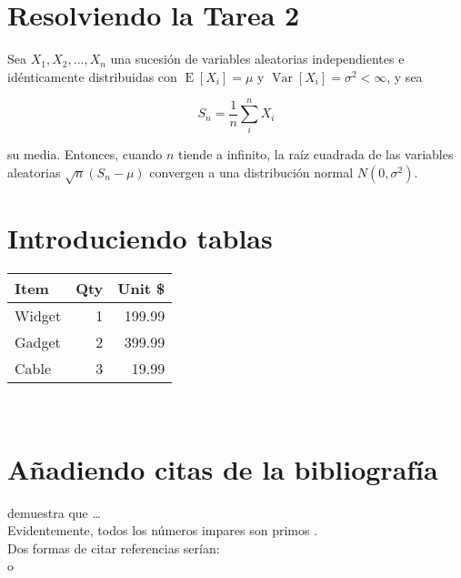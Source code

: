 \documentclass[12pt,a4paper]{article}
\begin{document}
\section*{Resolviendo la Tarea 2}

Sea $X_1, X_2, \ldots, X_n$ una sucesión de variables aleatorias independientes e idénticamente distribuidas con $\operatorname{E}[X_i] = \mu$ y $\operatorname{Var}[X_i] = \sigma^2  < \infty$, y sea

\begin{equation*}
S_n = \frac{1}{n} \sum_{i}^{n}X_i
\end{equation*}

su media. Entonces, cuando $n$ tiende a infinito, la raíz cuadrada de las variables aleatorias $\sqrt{n} (S_n - \mu)$ convergen a una distribución normal $N(0, \sigma^2)$.\\

\section*{Introduciendo tablas}

\begin{tabular}{|l|r|r|} \hline
Item   & Qty & Unit \$ \\\hline
Widget &   1 & 199.99 \\
Gadget &   2 & 399.99 \\
Cable  &   3 & 19.99 \\\hline
\end{tabular}\\


\section*{Añadiendo citas de la bibliografía}

\citet{Brooks1997Methodology}
demuestra que \ldots\\

Evidentemente, todos los números impares son primos \citep{Jacobson1999Towards}.\\

Dos formas de citar referencias serían:\\
\citep{Smith1990Enabling} o \citet{Smith1990Enabling}



\end{document}
